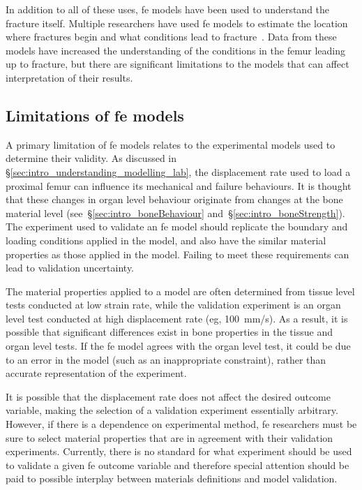 In addition to all of these uses, \ac{fe} models have been used to understand the fracture itself.
Multiple researchers have used \ac{fe} models to estimate the location where fractures begin and what conditions lead to fracture~\citep{keyak_prediction_2001, keyak_prediction_2000, keyak_prediction_1998, nawathe_microstructural_2013, lotz_fracture_1991, lotz_fracture_1991-1, lotz_stress_1995, ota_fracture_1999, tanck_predictive_2009, verhulp_comparison_2006, verhulp_load_2008, bryan_use_2009}.
Data from these models have increased the understanding of the conditions in the femur leading up to fracture, but there are significant limitations to the models that can affect interpretation of their results.
	
\subsection{Limitations of \acs*{fe} models}
A primary limitation of \ac{fe} models relates to the experimental models used to determine their validity.
As discussed in \S\ref{sec:intro_understanding_modelling_lab}, the displacement rate used to load a proximal femur can influence its mechanical and failure behaviours.
It is thought that these changes in organ level behaviour originate from changes at the bone material level (see~\S\ref{sec:intro_boneBehaviour} and~\S\ref{sec:intro_boneStrength}).
The experiment used to validate an \ac{fe} model should replicate the boundary and loading conditions applied in the model, and also have the similar material properties as those applied in the model.
Failing to meet these requirements can lead to validation uncertainty.

The material properties applied to a model are often determined from tissue level tests conducted at low strain rate, while the validation experiment is an organ level test conducted at high displacement rate (\ac{eg}, 100~mm/s).
As a result, it is possible that significant differences exist in bone properties in the tissue and organ level tests.
If the \ac{fe} model agrees with the organ level test, it could be due to an error in the model (such as an inappropriate constraint), rather than accurate representation of the experiment.

It is possible that the displacement rate does not affect the desired outcome variable, making the selection of a validation experiment essentially arbitrary.
However, if there is a dependence on experimental method, \ac{fe} researchers must be sure to select material properties that are in agreement with their validation experiments.
Currently, there is no standard for what experiment should be used to validate a given \ac{fe} outcome variable and therefore special attention should be paid to possible interplay between materials definitions and model validation.

